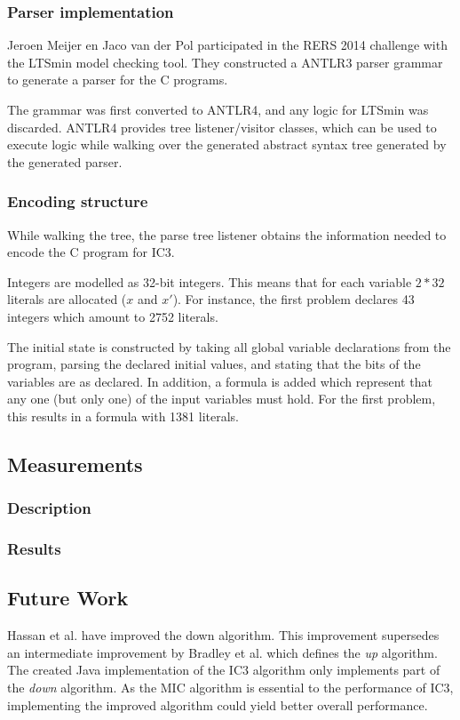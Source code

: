 \documentclass[a4paper]{article}
\begin{document}

\subsubsection{Parser implementation}
Jeroen Meijer en Jaco van der Pol participated in the RERS 2014 challenge with the LTSmin model checking tool.
They constructed a ANTLR3 parser grammar to generate a parser for the C programs.

The grammar was first converted to ANTLR4, and any logic for LTSmin was discarded.
ANTLR4 provides tree listener/visitor classes, which can be used to execute logic while walking over the generated abstract syntax tree generated by the generated parser.

\subsubsection{Encoding structure}
While walking the tree, the parse tree listener obtains the information needed to encode the C program for IC3.

Integers are modelled as 32-bit integers. This means that for each variable $2*32$ literals are allocated ($x$ and $x'$). For instance, the first problem declares 43 integers which amount to 2752 literals.

The initial state is constructed by taking all global variable declarations from the program, parsing the declared initial values, and stating that the bits of the variables are as declared. In addition, a formula is added which represent that any one (but only one) of the input variables must hold. For the first problem, this results in a formula with 1381 literals.

\subsection{Measurements}
\subsubsection{Description}
\subsubsection{Results}

\subsection{Future Work}
Hassan et al. \cite{Hassan2013} have improved the down algorithm. This improvement supersedes an intermediate improvement by Bradley et al. \cite{Bradley2007} which defines the \emph{up} algorithm. The created Java implementation of the IC3 algorithm only implements part of the \emph{down} algorithm. As the MIC algorithm is essential to the performance of IC3, implementing the improved algorithm could yield better overall performance.
\end{document}
